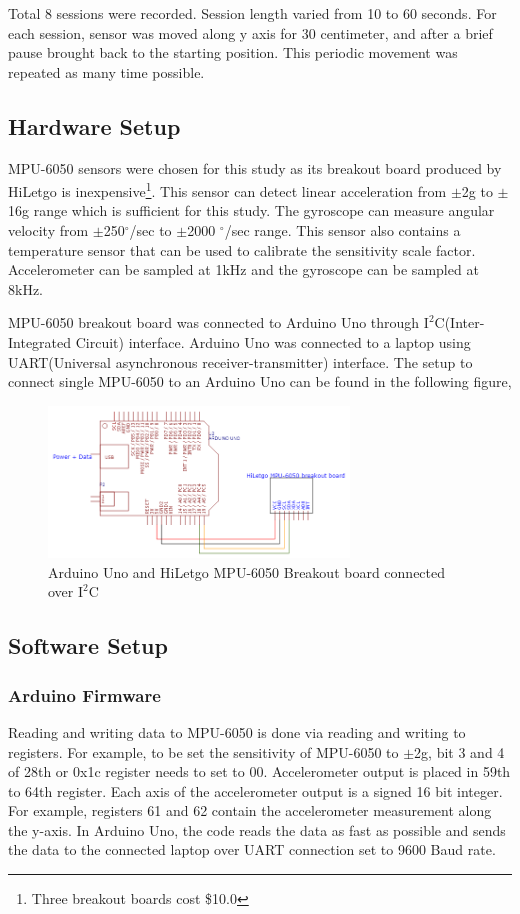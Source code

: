 \documentclass{article}
\begin{document}
Total 8 sessions were recorded. Session length varied from 10 to 60 seconds. For each session, sensor was moved along y axis for 30 centimeter, and after a brief pause brought back to the starting position. This periodic movement was repeated as many time possible. 

\subsection{Hardware Setup}
MPU-6050 sensors were chosen for this study as its breakout board produced by HiLetgo is inexpensive\footnote{Three breakout boards cost \$10.0}. This sensor can detect linear acceleration from $\pm$2g to $\pm$16g range which is sufficient for this study. The gyroscope can measure angular velocity from $\pm$250$^{\circ}$/sec to $\pm$2000 $^{\circ}$/sec range. This sensor also contains a temperature sensor that can be used to calibrate the sensitivity scale factor. Accelerometer can be sampled at 1kHz and the gyroscope can be sampled at 8kHz.

MPU-6050 breakout board was connected to Arduino Uno through $\text{I}^2\text{C}$(Inter-Integrated Circuit) interface. Arduino Uno was connected to a laptop using UART(Universal asynchronous receiver-transmitter) interface. The setup to connect single MPU-6050 to an Arduino Uno can be found in the following figure,
\begin{figure}[htp]
    \centering
    \includegraphics[width=8cm]{uno_mpu.png}
    \caption{Arduino Uno and HiLetgo MPU-6050 Breakout board connected over $\text{I}^2\text{C}$ }
\end{figure}

\subsection{Software Setup}
\subsubsection{Arduino Firmware}
Reading and writing data to MPU-6050 is done via reading and writing to registers. For example, to be set the sensitivity of MPU-6050 to $\pm$2g, bit 3 and 4 of 28th or 0x1c register needs to set to 00. Accelerometer output is placed in 59th to 64th register. Each axis of the accelerometer output is a signed 16 bit integer. For example, registers 61 and 62 contain the  accelerometer measurement along the y-axis. In Arduino Uno, the code reads the data as fast as possible and sends the data to the connected laptop over UART connection set to 9600 Baud rate. 
\end{document}
